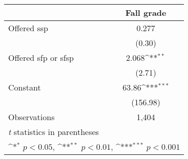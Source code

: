 {
\def\sym#1{\ifmmode^{#1}\else\(^{#1}\)\fi}
\begin{tabular}{l*{1}{c}}
\hline\hline
                &\multicolumn{1}{c}{Fall grade}\\
\hline
Offered ssp     &    0.277         \\
                &   (0.30)         \\
Offered sfp or sfsp&    2.068\sym{**} \\
                &   (2.71)         \\
Constant        &    63.86\sym{***}\\
                & (156.98)         \\
\hline
Observations    &    1,404         \\
\hline\hline
\multicolumn{2}{l}{\footnotesize \textit{t} statistics in parentheses}\\
\multicolumn{2}{l}{\footnotesize \sym{*} \(p<0.05\), \sym{**} \(p<0.01\), \sym{***} \(p<0.001\)}\\
\end{tabular}
}
